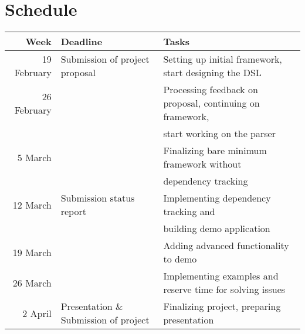 \documentclass{article}
\begin{document}
	\section{Schedule}
		\begin{tabular}{|r|l|l|} \hline
			Week & Deadline &Tasks \footnotemark  \\ \hline \hline
			19 February & Submission of project proposal & Setting up initial framework, start designing the DSL\\ \hline
			26 February &  & Processing feedback on proposal, continuing on framework,\\
			 & & start working on the parser \\ \hline
			5 March & & Finalizing bare minimum framework without \\
			 & & dependency tracking \\ \hline
			12 March & Submission status report & Implementing dependency tracking and \\
			 & & building demo application\\ \hline
			19 March & & Adding advanced functionality to demo\\ \hline
			26 March & & Implementing examples and reserve time for solving issues\\ \hline
			2 April & Presentation \& Submission of project & Finalizing project, preparing presentation\\ \hline
			
		\end{tabular}
\end{document}
